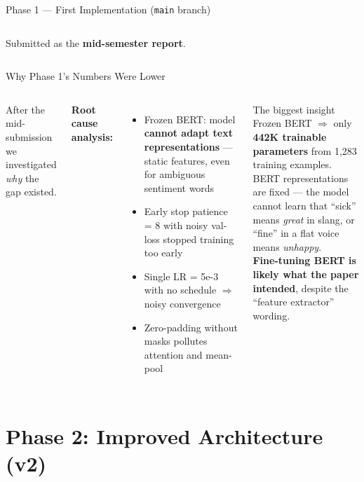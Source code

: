 \documentclass[aspectratio=169]{beamer}
\begin{document}
\begin{frame}{Phase 1 — First Implementation (\texttt{main} branch)}
\begin{columns}[T]
      \vspace{3pt}
      \small
      Submitted as the \textbf{mid-semester report}.
  \end{columns}
\end{frame}

\begin{frame}{Why Phase 1's Numbers Were Lower}
  \vspace{-2pt}
  \begin{columns}[T]
      \small After the mid-submission we investigated \emph{why} the gap existed.

      \smallskip
      \textbf{Root cause analysis:}
      \begin{itemize}\setlength{\itemsep}{2pt}
        \item Frozen BERT: model \textbf{cannot adapt text representations}
          — static features, even for ambiguous sentiment words
        \item Early stop patience = 8 with noisy val-loss stopped
          training too early
        \item Single LR = 5e-3 with no schedule $\Rightarrow$ noisy convergence
        \item Zero-padding without masks pollutes attention and mean-pool
      \end{itemize}

      \begin{alertblock}{The biggest insight}
        \small
        Frozen BERT $\Rightarrow$ only \textbf{442K trainable parameters}
        from 1,283 training examples.\\[4pt]
        BERT representations are fixed — the model cannot learn that
        ``sick'' means \textit{great} in slang, or ``fine'' in a flat
        voice means \textit{unhappy}.\\[4pt]
        \textbf{Fine-tuning BERT is likely what the paper intended},
        despite the ``feature extractor'' wording.
      \end{alertblock}
  \end{columns}
\end{frame}

\section{Phase 2: Improved Architecture (v2)}
\end{document}
